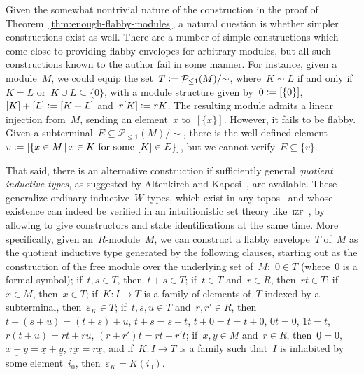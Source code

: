 \documentclass[oneside]{amsart}
\theoremstyle{definition}
\theoremstyle{plain}
\theoremstyle{remark}
\renewcommand{\P}{\mathcal{P}}
\newcommand{\defeq}{\vcentcolon=}
\renewcommand{\_}{\mathpunct{.}\,}
\begin{document}
Given the somewhat nontrivial nature of the construction in the proof of
Theorem~\ref{thm:enough-flabby-modules}, a natural question is whether simpler
constructions exist as well.
There are a number of simple constructions which come close to providing
flabby envelopes for arbitrary modules, but all such constructions known to the
author fail in some manner. For instance, given a module~$M$, we could equip the set~$T
\defeq \P_{\leq1}(M)/{\sim}$, where~$K \sim L$ if and only if~$K = L$ or~$K
\cup L \subseteq \{0\}$, with a module structure given by~$0 \defeq [\{0\}]$,
$[K]+[L] \defeq [K+L]$ and~$r [K] \defeq rK$. The resulting module admits a
linear injection from~$M$, sending an element~$x$ to~$[\{x\}]$. However, it
fails to be flabby. Given a subterminal~$E \subseteq \P_{\leq1}(M)/{\sim}$,
there is the well-defined element~$v \defeq [\{x \in M\,|\,\text{$x \in K$ for
some~$[K] \in E$}\}]$, but we cannot verify~$E \subseteq \{v\}$.

That said, there is an alternative construction if sufficiently general
\emph{quotient inductive types}, as suggested by Altenkirch and
Kaposi~\cite{altenkirch-kaposi:qits}, are available. These generalize ordinary
inductive~$W$-types, which exist in any
topos~\cite{moerdijk-palmgren:wellfounded-trees,berg-moerdijk:w-types-in-sheaves,berg-kouwenhoven-gentil:w-types-in-eff}
and whose existence
can indeed be verified in an intuitionistic set theory like~\textsc{izf}~\cite{crosilla:cst-izf}, by allowing to
give constructors and state identifications at the same time. More
specifically, given an~$R$-module~$M$, we can construct a flabby envelope~$T$
of~$M$ as the quotient inductive type generated by the following clauses,
starting out as the construction of the free module over the underlying set
of~$M$:~$0
\in T$ (where~$0$ is a formal symbol); if~$t,s \in T$, then~$t + s \in T$;
if~$t \in T$ and~$r \in R$, then~$rt \in T$; if~$x \in M$, then~$\underline{x}
\in T$; if~$K : I \to T$ is a family of elements of~$T$ indexed by a subterminal, then~$\varepsilon_K \in T$;
if~$t,s,u \in T$ and~$r,r' \in R$, then~$t + (s + u) = (t + s) + u$, $t + s = s + t$, $t + 0 = t
= t + 0$, $0t = 0$, $1t = t$, $r(t+u) = rt + ru$, $(r+r')t = rt + r't$; if~$x,y
\in M$ and~$r \in R$, then~$\underline{0} = 0$, $\underline{x + y} =
\underline{x} + \underline{y}$, $\underline{rx} = r \underline{x}$; and if~$K :
I \to T$ is a family such that~$I$ is inhabited by some element~$i_0$,
then~$\varepsilon_{K} = K(i_0)$.
\end{document}
